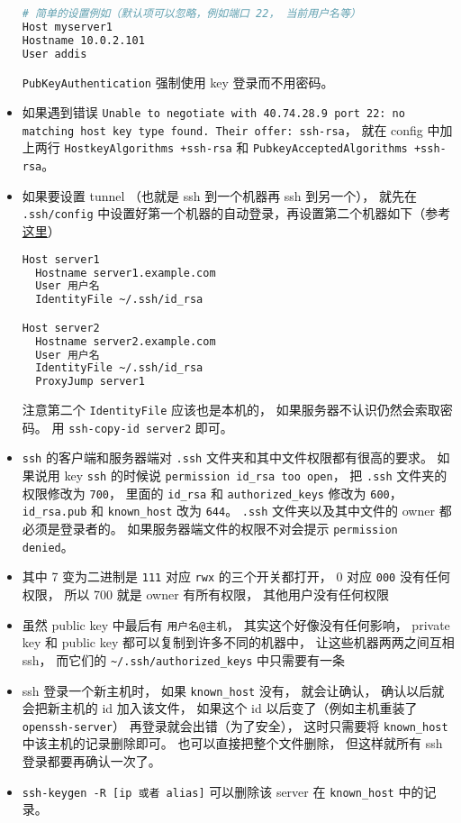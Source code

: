 \begin{itemize}
\begin{lstlisting}[language=bash]
# 简单的设置例如（默认项可以忽略，例如端口 22， 当前用户名等）
Host myserver1
Hostname 10.0.2.101
User addis
\end{lstlisting}
\verb|PubKeyAuthentication| 强制使用 key 登录而不用密码。

\item 如果遇到错误 \verb|Unable to negotiate with 40.74.28.9 port 22: no matching host key type found. Their offer: ssh-rsa|， 就在 config 中加上两行 \verb|HostkeyAlgorithms +ssh-rsa| 和 \verb|PubkeyAcceptedAlgorithms +ssh-rsa|。

\item 如果要设置 tunnel （也就是 ssh 到一个机器再 ssh 到另一个）， 就先在 \verb|.ssh/config| 中设置好第一个机器的自动登录，再设置第二个机器如下（参考\href{https://askubuntu.com/questions/311447/how-do-i-ssh-to-machine-a-via-b-in-one-command}{这里}）
\begin{lstlisting}[language=bash]
Host server1
  Hostname server1.example.com
  User 用户名
  IdentityFile ~/.ssh/id_rsa

Host server2
  Hostname server2.example.com
  User 用户名
  IdentityFile ~/.ssh/id_rsa
  ProxyJump server1
\end{lstlisting}
注意第二个 \verb|IdentityFile| 应该也是本机的， 如果服务器不认识仍然会索取密码。 用 \verb|ssh-copy-id server2| 即可。

\item \verb|ssh| 的客户端和服务器端对 \verb|.ssh| 文件夹和其中文件权限都有很高的要求。 如果说用 key \verb`ssh` 的时候说 \verb`permission id_rsa too open`， 把 \verb|.ssh| 文件夹的权限修改为 \verb|700|， 里面的 \verb|id_rsa| 和 \verb|authorized_keys| 修改为 \verb|600|， \verb|id_rsa.pub| 和 \verb|known_host| 改为 \verb|644|。 \verb|.ssh| 文件夹以及其中文件的 owner 都必须是登录者的。 如果服务器端文件的权限不对会提示 \verb|permission denied|。
\item 其中 7 变为二进制是 \verb`111` 对应 \verb`rwx` 的三个开关都打开， 0 对应 \verb`000` 没有任何权限， 所以 700 就是 owner 有所有权限， 其他用户没有任何权限
\item 虽然 public key 中最后有 \verb`用户名@主机`， 其实这个好像没有任何影响， private key 和 public key 都可以复制到许多不同的机器中， 让这些机器两两之间互相 ssh， 而它们的 \verb`~/.ssh/authorized_keys` 中只需要有一条
\item ssh 登录一个新主机时， 如果 \verb`known_host` 没有， 就会让确认， 确认以后就会把新主机的 id 加入该文件， 如果这个 id 以后变了（例如主机重装了 \verb`openssh-server`） 再登录就会出错（为了安全）， 这时只需要将 \verb`known_host` 中该主机的记录删除即可。 也可以直接把整个文件删除， 但这样就所有 ssh 登录都要再确认一次了。
\item \verb|ssh-keygen -R [ip 或者 alias]| 可以删除该 server 在 \verb|known_host| 中的记录。
\end{itemize}

